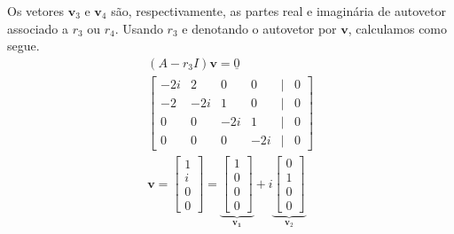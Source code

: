 \begin{resol}
\begin{enumerate}[a)]
    Os vetores $\pmb{v}_3$ e $\pmb{v}_4$ são, respectivamente, as partes real e imaginária de autovetor associado a $r_3$ ou $r_4$. Usando $r_3$ e denotando o autovetor por $\pmb{v}$, calculamos como segue.
    \begin{gather}
      (A-r_3I)\pmb{v} = \underline{0} \\
      \begin{bmatrix}
        -2i & 2 & 0 & 0 & | & 0 \\
        -2 & -2i & 1 & 0 & | & 0 \\
        0 & 0 & -2i & 1 & | & 0 \\
        0 & 0 & 0 & -2i & | & 0
      \end{bmatrix}\\
      \pmb{v} =
      \begin{bmatrix}
        1 \\
        i \\
        0 \\
        0
      \end{bmatrix} =
      \underbrace{\begin{bmatrix}
        1 \\
        0 \\
        0 \\
        0
      \end{bmatrix}}_{\pmb{v_1}} + i
    \underbrace{\begin{bmatrix}
        0 \\
        1 \\
        0 \\
        0
      \end{bmatrix}}_{\pmb{v}_2}
    \end{gather}
  \end{enumerate}


\end{resol}
